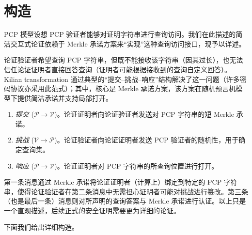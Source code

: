 \documentclass[american,singlepageview]{snargs-book-zh}
\newcommand{\DoQuote}[1]{``#1''}
\newcommand{\ProtoProver}{P}
\newcommand{\ProtoVerifier}{V}
\newcommand{\ARGFormat}[1]{\mathcal{#1}}
\newcommand{\ARGProver}{\ARGFormat{\ProtoProver}}
\newcommand{\ARGVerifier}{\ARGFormat{\ProtoVerifier}}
\begin{document}
\section{构造}
\label{section:kilian-construction}

PCP 模型设想 PCP 验证者能够对证明字符串进行查询访问。我们在此描述的简洁交互式论证依赖于 Merkle 承诺方案来\DoQuote{实现}这种查询访问接口，现予以详述。

论证验证者希望查询 PCP 字符串，但既不能接收该字符串（因其过长），也无法信任论证证明者直接回答查询（证明者可能根据接收到的查询自定义回答）。Kilian transformation 通过典型的“提交–挑战–响应”结构解决了这一问题（许多密码协议亦采用此范式）；其中，核心是 Merkle 承诺方案，该方案在随机预言机模型下提供简洁承诺并支持局部打开。

\begin{enumerate}[noitemsep]
  \item \emph{提交} ($\ARGProver \to \ARGVerifier$)。论证证明者向论证验证者发送对 PCP 字符串的短 Merkle 承诺。
  \item \emph{挑战} ($\ARGVerifier \to \ARGProver$)。论证验证者向论证证明者发送 PCP 验证者的随机性，用于确定查询集。
  \item \emph{响应} ($\ARGProver \to \ARGVerifier$)。论证证明者对 PCP 字符串的所查询位置进行打开。
\end{enumerate}

第一条消息通过 Merkle 承诺将论证证明者（计算上）绑定到特定的 PCP 字符串，使得论证验证者在第二条消息中无需担心证明者可能对挑战进行篡改。第三条（也是最后一条）消息则对所声明的查询答案与 Merkle 承诺进行认证。以上只是一个直观描述，后续正式的安全证明需要更为详细的论证。

下面我们给出详细构造。
\end{document}
